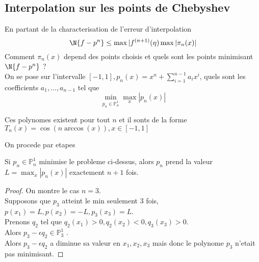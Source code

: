 
\subsection{Interpolation sur les points de Chebyshev}
En partant de la characterisation de l'erreur d'interpolation
\[ 
\N { f- p^{n}} \leq  \max | f^{( n+1) } ( \eta) \max |\pi_n( x) |
\]
Comment $\pi_n( x) $ depend des points choisis et quels sont les points minimisant $ \N { f-p^{n}} $ ?\\
On se pose sur l'intervalle $ [ -1,1], p_n( x) = x^{n} +  \sum_{ i=1}^{n-1} a_i x^{i} $, quels sont les coefficients $a_1,\ldots, a_{n-1} $ tel que 
\[ 
\min_{p_n \in \mathbb{P}_n^{1}} \max_{x} |p_n( x) |
\]
\begin{thm}
	Ces polynomes existent pour tout $n$ et il sonts de la forme $T_n( x) = \cos ( n \arccos( x) ) , x\in [ -1,1] $ 
\end{thm}
On procede par etapes
\begin{propo}
Si $p_n\in \mathbb{P}_n^{1}$ minimise le probleme ci-dessus, alors $p_n$ prend la valeur $L = \max_{x} |p_n( x) |$ exactement $n+1$ fois.
\end{propo}
\begin{proof}
On montre le cas $n=3$.\\
Supposons que $p_3$ atteint le min seulement 3 fois, $p( x_1) =L, p( x_2) = -L, p_3 ( x_3) = L$.\\
Prenons $q_2$ tel que $ q_2( x_1) > 0 , q_2( x_2) < 0 , q_3( x_3) >0$.\\
Alors $ p_3- \epsilon q_2 \in \mathbb{P}_3^{1 }$ .\\
Alors $p_3-\epsilon q_2$ a diminue sa valeur en $x_1,x_2,x_3$ mais donc le polynome $p_3$ n'etait pas minimisant.
\end{proof}
